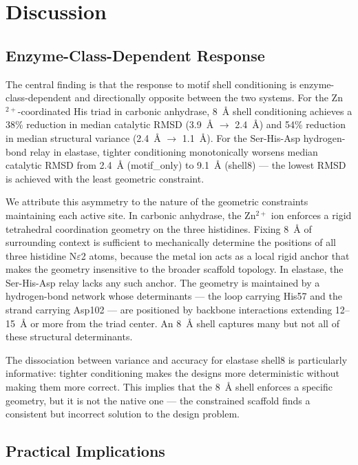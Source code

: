 \documentclass[11pt,letterpaper]{article}
\begin{document}
\section{Discussion}

\subsection{Enzyme-Class-Dependent Response}

The central finding is that the response to motif shell conditioning is enzyme-class-dependent and directionally opposite between the two systems. For the Zn$^{2+}$-coordinated His triad in carbonic anhydrase, 8~\AA{} shell conditioning achieves a 38\% reduction in median catalytic RMSD (3.9~\AA{} $\to$ 2.4~\AA{}) and 54\% reduction in median structural variance (2.4~\AA{} $\to$ 1.1~\AA{}). For the Ser-His-Asp hydrogen-bond relay in elastase, tighter conditioning monotonically worsens median catalytic RMSD from 2.4~\AA{} (motif\_only) to 9.1~\AA{} (shell8) — the lowest RMSD is achieved with the least geometric constraint.

We attribute this asymmetry to the nature of the geometric constraints maintaining each active site. In carbonic anhydrase, the Zn$^{2+}$ ion enforces a rigid tetrahedral coordination geometry on the three histidines. Fixing 8~\AA{} of surrounding context is sufficient to mechanically determine the positions of all three histidine N$\varepsilon$2 atoms, because the metal ion acts as a local rigid anchor that makes the geometry insensitive to the broader scaffold topology. In elastase, the Ser-His-Asp relay lacks any such anchor. The geometry is maintained by a hydrogen-bond network whose determinants — the loop carrying His57 and the strand carrying Asp102 — are positioned by backbone interactions extending 12--15~\AA{} or more from the triad center. An 8~\AA{} shell captures many but not all of these structural determinants.

The dissociation between variance and accuracy for elastase shell8 is particularly informative: tighter conditioning makes the designs more deterministic without making them more correct. This implies that the 8~\AA{} shell enforces a specific geometry, but it is not the native one — the constrained scaffold finds a consistent but incorrect solution to the design problem.

\subsection{Practical Implications}
\end{document}
